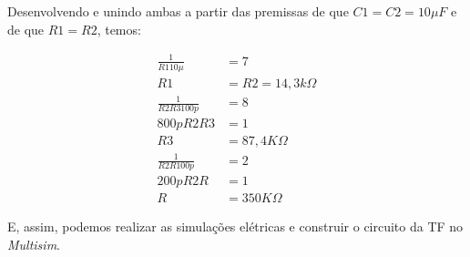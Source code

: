 \documentclass[
	article,			%
	11pt,				%
	oneside,			%
	a4paper,			%
	english,			%
	brazil,				%
	sumario=tradicional
	]{abntex2}
\begin{document}
Desenvolvendo e unindo ambas a partir das premissas de que ${C1 = C2 = 10 \mu F}$ e de que ${R1 = R2}$, temos:

\begin{align*}
  \frac{1}{R1 10\mu} &= 7 \\
  R1 &= R2 = 14,3k\Omega \\
  \frac{1}{R2R3 100p} &= 8 \\
  800p R2R3 &= 1 \\
  R3 &= 87,4K\Omega \\
  \frac{1}{R2R 100p} &= 2 \\
  200p R2R &= 1 \\
  R &= 350K\Omega
\end{align*}

E, assim, podemos realizar as simulações elétricas e construir o circuito da TF no \emph{Multisim}.
\end{document}
